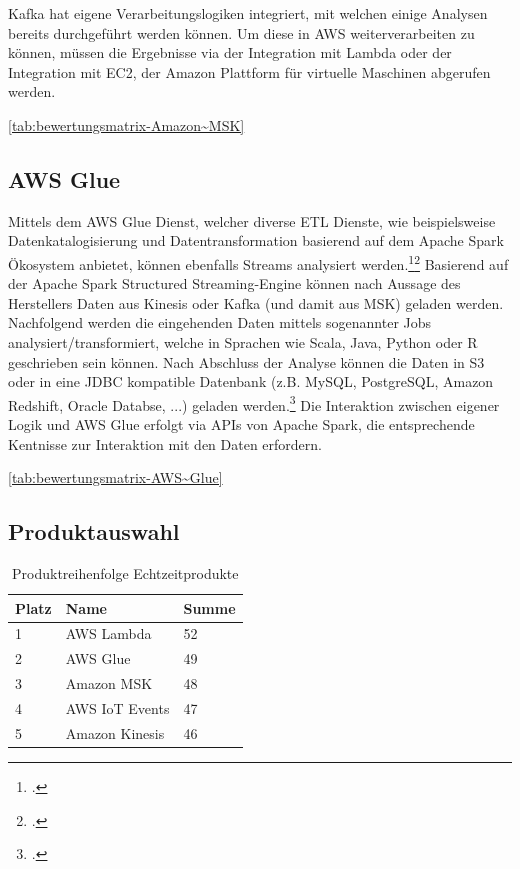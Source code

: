 Kafka hat eigene Verarbeitungslogiken integriert, mit welchen einige Analysen bereits durchgeführt werden können. Um diese in \ac{AWS} weiterverarbeiten zu können, müssen die Ergebnisse via der Integration mit Lambda oder der Integration mit \ac{EC2}, der Amazon Plattform für virtuelle Maschinen abgerufen werden.

\autoref{tab:bewertungsmatrix-Amazon~MSK}


\subsection{AWS Glue}
Mittels dem \ac{AWS} Glue Dienst, welcher diverse \ac{ETL} Dienste, wie beispielsweise Datenkatalogisierung und Datentransformation basierend auf dem Apache Spark Ökosystem anbietet, können ebenfalls Streams analysiert werden.\footcite[Vgl.][]{AmazonWebServicesInc..o.J.d}\nzitat\footcite[Vgl. auch im Folgenden][]{AmazonWebServicesInc..2020} Basierend auf der Apache Spark Structured 
Streaming-Engine können nach Aussage des Herstellers Daten aus Kinesis oder Kafka (und damit aus \ac{MSK}) geladen werden. Nachfolgend werden die eingehenden Daten mittels sogenannter Jobs analysiert/transformiert, welche in Sprachen wie Scala, Java, Python oder R geschrieben sein können. Nach Abschluss der Analyse können die Daten in \ac{S3} oder in eine \ac{JDBC} kompatible Datenbank (z.B. MySQL, PostgreSQL, Amazon Redshift, Oracle Databse, ...) geladen werden.\footcite[Vgl.][]{AmazonWebServicesInc..o.J.e} Die Interaktion zwischen eigener Logik und AWS Glue erfolgt via \acp{API} von Apache Spark, die entsprechende Kentnisse zur Interaktion mit den Daten erfordern.

\autoref{tab:bewertungsmatrix-AWS~Glue}

\subsection{Produktauswahl}

\begin{table}[H]
\centering
\begin{tabular}{|l|l|l|}
\hline
Platz & Name & Summe \\ \hline
1 & AWS Lambda & \cellcolor[HTML]{DAE8FC}52 \\ \hline
2 & AWS Glue & \cellcolor[HTML]{DAE8FC}49 \\ \hline
3 & Amazon MSK & \cellcolor[HTML]{DAE8FC}48 \\ \hline
4 & AWS IoT Events & \cellcolor[HTML]{DAE8FC}47 \\ \hline
5 & Amazon Kinesis & \cellcolor[HTML]{DAE8FC}46 \\ \hline
\end{tabular}
\caption{Produktreihenfolge Echtzeitprodukte}
\label{tab:Reihenfolge-Echtzeit}
\end{table}
